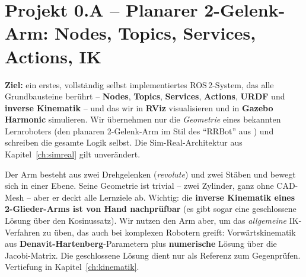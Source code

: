 
\chapter{Projekt 0.A -- Planarer 2-Gelenk-Arm: Nodes, Topics, Services, Actions, IK}
\label{ch:projekt0a}

\textbf{Ziel:} ein erstes, vollständig selbst implementiertes ROS\,2-System, das
alle Grundbausteine berührt -- \textbf{Nodes}, \textbf{Topics},
\textbf{Services}, \textbf{Actions}, \textbf{URDF} und \textbf{inverse Kinematik}
-- und das wir in \textbf{RViz} visualisieren und in \textbf{Gazebo Harmonic}
simulieren. Wir übernehmen nur die \emph{Geometrie} eines bekannten
Lernroboters (den planaren 2-Gelenk-Arm im Stil des ``RRBot'' aus
) und schreiben die gesamte Logik selbst. Die
Sim-Real-Architektur aus Kapitel~\ref{ch:simreal} gilt unverändert.

\begin{infobox}[title=Warum gerade dieser Arm?]
Der Arm besteht aus zwei Drehgelenken (\emph{revolute}) und zwei Stäben und
bewegt sich in einer Ebene. Seine Geometrie ist trivial -- zwei Zylinder, ganz
ohne CAD-Mesh -- aber er deckt alle Lernziele ab. Wichtig: die \textbf{inverse
Kinematik eines 2-Glieder-Arms ist von Hand nachprüfbar} (es gibt sogar eine
geschlossene Lösung über den Kosinussatz). Wir nutzen den Arm aber, um das
\emph{allgemeine} IK-Verfahren zu üben, das auch bei komplexen Robotern greift:
Vorwärtskinematik aus \textbf{Denavit-Hartenberg}-Parametern plus
\textbf{numerische} Lösung über die Jacobi-Matrix. Die geschlossene Lösung dient
nur als Referenz zum Gegenprüfen. Vertiefung in Kapitel~\ref{ch:kinematik}.
\end{infobox}

